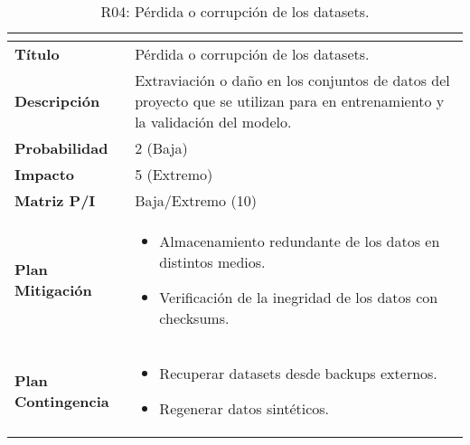 \begin{table}[H]
\centering
\begin{tabular}{|>{\bfseries}l|p{10cm}|}
\hline
\rowcolor{lightgray}
\multicolumn{2}{|c|}{\textbf{Riesgo R04}} \\ \hline
Título & Pérdida o corrupción de los datasets. \\ \hline
Descripción & Extraviación o daño en los conjuntos de datos del proyecto que se utilizan para en entrenamiento y la validación del modelo.\\ \hline
Probabilidad & 2 (Baja) \\ \hline
Impacto & 5 (Extremo) \\ \hline
Matriz P/I & Baja/Extremo (10) \\ \hline
Plan Mitigación & 
\begin{itemize}
\item Almacenamiento redundante de los datos en distintos medios.
\item Verificación de la inegridad de los datos con checksums.
\end{itemize} \\ \hline
Plan Contingencia & 
\begin{itemize}
\item Recuperar datasets desde backups externos.
\item Regenerar datos sintéticos.
\end{itemize} \\ \hline
\end{tabular}
\caption{R04: Pérdida o corrupción de los datasets.}
\label{tab:R04}
\end{table}

